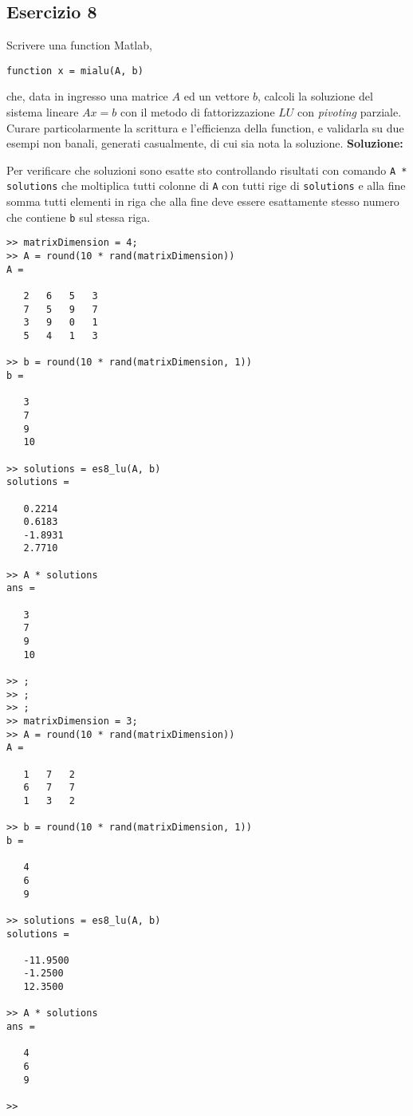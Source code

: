 \subsection{Esercizio 8}
Scrivere una function Matlab,
\begin{lstlisting}
function x = mialu(A, b)
\end{lstlisting}
che, data in ingresso una matrice $A$ ed un vettore $b$, calcoli la soluzione
del sistema lineare $Ax = b$ con il metodo di fattorizzazione $LU$ con \textit{pivoting} parziale.
Curare particolarmente la scrittura e l'efficienza della function,
e validarla su due esempi non banali, generati casualmente,
di cui sia nota la soluzione.
\newline \textbf{Soluzione:} \newline

Per verificare che soluzioni sono esatte sto controllando risultati con comando \lstinline{A * solutions}
che moltiplica tutti colonne di \lstinline{A} con tutti rige di \lstinline{solutions} e alla fine somma tutti
elementi in riga che alla fine deve essere esattamente stesso numero
che contiene \lstinline{b} sul stessa riga.
\begin{lstlisting}
>> matrixDimension = 4;
>> A = round(10 * rand(matrixDimension))
A =

   2   6   5   3
   7   5   9   7
   3   9   0   1
   5   4   1   3

>> b = round(10 * rand(matrixDimension, 1))
b =

   3
   7
   9
   10

>> solutions = es8_lu(A, b)
solutions =

   0.2214
   0.6183
   -1.8931
   2.7710

>> A * solutions
ans =

   3
   7
   9
   10

>> ;
>> ;
>> ;
>> matrixDimension = 3;
>> A = round(10 * rand(matrixDimension))
A =

   1   7   2
   6   7   7
   1   3   2

>> b = round(10 * rand(matrixDimension, 1))
b =

   4
   6
   9

>> solutions = es8_lu(A, b)
solutions =

   -11.9500
   -1.2500
   12.3500

>> A * solutions
ans =

   4
   6
   9

>>
\end{lstlisting}
